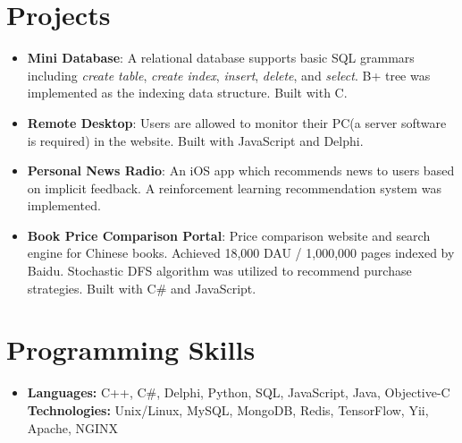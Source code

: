 \documentclass[letterpaper,9pt]{article}
\newcommand{\resumeItem}[2]{
  \item\small{
    \textbf{#1}{: #2 \vspace{-2pt}}
  }
}
\newcommand{\resumeSubItem}[2]{\resumeItem{#1}{#2}\vspace{-4pt}}
\newcommand{\resumeSubHeadingListStart}{\begin{itemize}[leftmargin=*]}
\newcommand{\resumeSubHeadingListEnd}{\end{itemize}}
\begin{document}
\section{Projects}
  \resumeSubHeadingListStart
    \resumeSubItem{Mini Database}
      {A relational database supports basic SQL grammars including {\it create table}, {\it create index}, {\it insert}, {\it delete}, and {\it select}. B+ tree was implemented as the indexing data structure. Built with C.}
    \resumeSubItem{Remote Desktop}
      {Users are allowed to monitor their PC(a server software is required) in the website. Built with JavaScript and Delphi.}
    \resumeSubItem{Personal News Radio}
      {An iOS app which recommends news to users based on implicit feedback. A reinforcement learning recommendation system was implemented.}
    \resumeSubItem{Book Price Comparison Portal}
      {Price comparison website and search engine for Chinese books. Achieved 18,000 DAU / 1,000,000 pages indexed by Baidu. Stochastic DFS algorithm was utilized to recommend purchase strategies. Built with C\# and JavaScript.}
  \resumeSubHeadingListEnd


      

\section{Programming Skills}
  \resumeSubHeadingListStart
    \item{\textbf{Languages:}
      {C++, C\#, Delphi, Python, SQL, JavaScript, Java, Objective-C}
    }\\
    \textbf{Technologies:}{
      Unix/Linux, MySQL, MongoDB, Redis, TensorFlow, Yii, Apache, NGINX
    }
  \resumeSubHeadingListEnd
\end{document}
